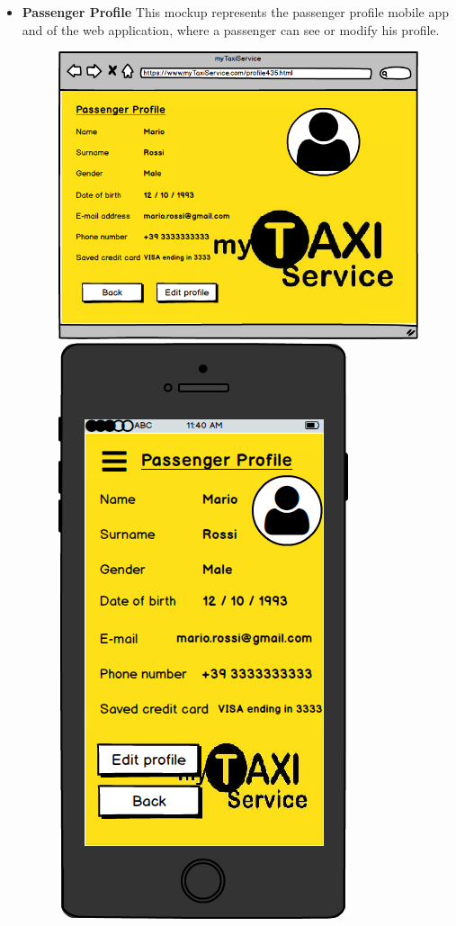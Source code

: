 \documentclass[18pt,oneside,a4paper, titlepage]{article}
\begin{document}
\begin{itemize}
\begin{figure}[h]
				\end{figure}
				\\ \\
				\item \textbf{Passenger Profile} This mockup represents the passenger profile mobile app and of the web application, where a passenger can see or modify his profile.\\
				\begin{figure}[h]
					\includegraphics[scale=0.3]{WebAppPassengerProfile.png}%
					\qquad\qquad
					\includegraphics[scale=0.3]{MobileAppPassengerProfile.png}

\end{figure}
\end{itemize}
\end{document}
